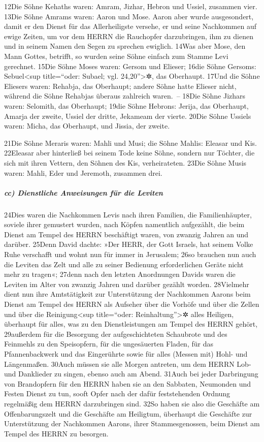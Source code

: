 12Die Söhne Kehaths waren: Amram, Jizhar, Hebron und Ussiel, zusammen
vier. 13Die Söhne Amrams waren: Aaron und Mose. Aaron aber wurde
ausgesondert, damit er den Dienst für das Allerheiligste versehe, er und
seine Nachkommen auf ewige Zeiten, um vor dem HERRN die Rauchopfer
darzubringen, ihm zu dienen und in seinem Namen den Segen zu sprechen
ewiglich. 14Was aber Mose, den Mann Gottes, betrifft, so wurden seine
Söhne einfach zum Stamme Levi gerechnet. 15Die Söhne Moses waren: Gersom
und Elieser; 16die Söhne Gersoms: Sebuel\textless sup title=``oder:
Subael; vgl. 24,20''\textgreater✲, das Oberhaupt. 17Und die Söhne
Eliesers waren: Rehabja, das Oberhaupt; andere Söhne hatte Elieser
nicht, während die Söhne Rehabjas überaus zahlreich waren.~-- 18Die
Söhne Jizhars waren: Selomith, das Oberhaupt; 19die Söhne Hebrons:
Jerija, das Oberhaupt, Amarja der zweite, Ussiel der dritte, Jekameam
der vierte. 20Die Söhne Ussiels waren: Micha, das Oberhaupt, und Jissia,
der zweite.

21Die Söhne Meraris waren: Mahli und Musi; die Söhne Mahlis: Eleasar und
Kis. 22Eleasar aber hinterließ bei seinem Tode keine Söhne, sondern nur
Töchter, die sich mit ihren Vettern, den Söhnen des Kis, verheirateten.
23Die Söhne Musis waren: Mahli, Eder und Jeremoth, zusammen drei.

\hypertarget{cc-dienstliche-anweisungen-fuxfcr-die-leviten}{%
\subparagraph{cc) Dienstliche Anweisungen für die
Leviten}\label{cc-dienstliche-anweisungen-fuxfcr-die-leviten}}

24Dies waren die Nachkommen Levis nach ihren Familien, die
Familienhäupter, soviele ihrer gemustert wurden, nach Köpfen namentlich
aufgezählt, die beim Dienst am Tempel des HERRN beschäftigt waren, von
zwanzig Jahren an und darüber. 25Denn David dachte: »Der HERR, der Gott
Israels, hat seinem Volke Ruhe verschafft und wohnt nun für immer in
Jerusalem; 26so brauchen nun auch die Leviten das Zelt und alle zu
seiner Bedienung erforderlichen Geräte nicht mehr zu tragen«; 27denn
nach den letzten Anordnungen Davids waren die Leviten im Alter von
zwanzig Jahren und darüber gezählt worden. 28Vielmehr dient nun ihre
Amtstätigkeit zur Unterstützung der Nachkommen Aarons beim Dienst am
Tempel des HERRN als Aufseher über die Vorhöfe und über die Zellen und
über die Reinigung\textless sup title=``oder: Reinhaltung''\textgreater✲
alles Heiligen, überhaupt für alles, was zu den Dienstleistungen am
Tempel des HERRN gehört, 29außerdem für die Besorgung der
aufgeschichteten Schaubrote und des Feinmehls zu den Speisopfern, für
die ungesäuerten Fladen, für das Pfannenbackwerk und das Eingerührte
sowie für alles (Messen mit) Hohl- und Längenmaßen. 30Auch müssen sie
alle Morgen antreten, um dem HERRN Lob- und Danklieder zu singen, ebenso
auch am Abend. 31Auch bei jeder Darbringung von Brandopfern für den
HERRN haben sie an den Sabbaten, Neumonden und Festen Dienst zu tun,
sooft Opfer nach der dafür feststehenden Ordnung regelmäßig dem HERRN
darzubringen sind. 32So haben sie also die Geschäfte am Offenbarungszelt
und die Geschäfte am Heiligtum, überhaupt die Geschäfte zur
Unterstützung der Nachkommen Aarons, ihrer Stammesgenossen, beim Dienst
am Tempel des HERRN zu besorgen.

